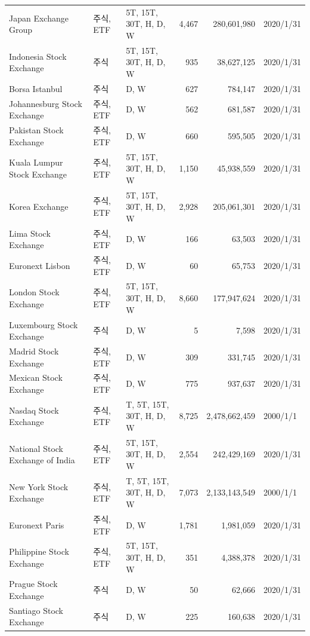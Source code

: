 \begin{footnotesize}
\begin{center}
\begin{longtable}{@{\extracolsep{\fill}} l l l r r l @{}}
        Japan Exchange Group &  주식, ETF & 5T, 15T, 30T, H, D, W & 4,467 & 280,601,980 &  2020/1/31 \\
        Indonesia Stock Exchange & 주식 & 5T, 15T, 30T, H, D, W & 935 & 38,627,125 &  2020/1/31 \\
        Borsa Istanbul &  주식 & D, W  & 627 & 784,147 &  2020/1/31 \\
        Johannesburg Stock Exchange & 주식, ETF & D, W  & 562 & 681,587 & 2020/1/31 \\
        Pakistan Stock Exchange & 주식, ETF & D, W  & 660 & 595,505 & 2020/1/31 \\
        Kuala Lumpur Stock Exchange & 주식, ETF & 5T, 15T, 30T, H, D, W & 1,150 & 45,938,559 & 2020/1/31 \\
        Korea Exchange & 주식, ETF & 5T, 15T, 30T, H, D, W & 2,928 & 205,061,301 & 2020/1/31 \\
        Lima Stock Exchange & 주식, ETF & D, W  & 166 & 63,503 & 2020/1/31 \\
        Euronext Lisbon & 주식, ETF & D, W  & 60 & 65,753 & 2020/1/31 \\
        London Stock Exchange & 주식, ETF & 5T, 15T, 30T, H, D, W & 8,660 & 177,947,624 & 2020/1/31 \\
        Luxembourg Stock Exchange & 주식 & D, W  & 5 & 7,598 & 2020/1/31 \\
        Madrid Stock Exchange & 주식, ETF & D, W  & 309 & 331,745 & 2020/1/31 \\
        Mexican Stock Exchange & 주식, ETF & D, W  & 775 & 937,637 & 2020/1/31 \\
        Nasdaq Stock Exchange & 주식, ETF & T, 5T, 15T, 30T, H, D, W & 8,725 & 2,478,662,459 & 2000/1/1 \\
        National Stock Exchange of India & 주식, ETF & 5T, 15T, 30T, H, D, W & 2,554 & 242,429,169 & 2020/1/31 \\
        New York Stock Exchange & 주식, ETF & T, 5T, 15T, 30T, H, D, W & 7,073 & 2,133,143,549 & 2000/1/1 \\
        Euronext Paris & 주식, ETF & D, W  & 1,781 & 1,981,059 & 2020/1/31 \\
        Philippine Stock Exchange & 주식, ETF & 5T, 15T, 30T, H, D, W & 351 & 4,388,378 & 2020/1/31 \\
        Prague Stock Exchange & 주식 & D, W  & 50 & 62,666 & 2020/1/31 \\
        Santiago Stock Exchange & 주식 & D, W  & 225 & 160,638 & 2020/1/31 \\

\end{longtable}
\end{center}
\end{footnotesize}
